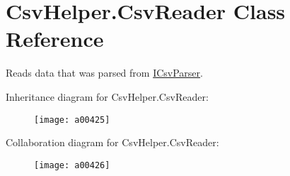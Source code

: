 \hypertarget{a00071}{\section{Csv\-Helper.\-Csv\-Reader Class Reference}
\label{a00071}
}


Reads data that was parsed from \hyperlink{a00107}{I\-Csv\-Parser}.  




Inheritance diagram for Csv\-Helper.\-Csv\-Reader\-:
\nopagebreak
\begin{figure}[H]
\begin{center}
\leavevmode
\texttt{[image: a00425]}
\end{center}
\end{figure}


Collaboration diagram for Csv\-Helper.\-Csv\-Reader\-:
\nopagebreak
\begin{figure}[H]
\begin{center}
\leavevmode
\texttt{[image: a00426]}
\end{center}
\end{figure}
